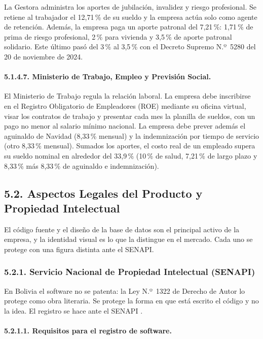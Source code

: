 La Gestora administra los aportes de jubilación, invalidez y riesgo profesional. Se retiene al trabajador el 12,71\,\% de su sueldo y la empresa actúa solo como agente de retención. Además, la empresa paga un aporte patronal del 7,21\,\%: 1,71\,\% de prima de riesgo profesional, 2\,\% para vivienda y 3,5\,\% de aporte patronal solidario. Este último pasó del 3\,\% al 3,5\,\% con el Decreto Supremo N.º~5280 del 20 de noviembre de 2024.

\paragraph{5.1.4.7. Ministerio de Trabajo, Empleo y Previsión Social.}

El Ministerio de Trabajo \parencite{mintrabajo2026} regula la relación laboral. La empresa debe inscribirse en el Registro Obligatorio de Empleadores (ROE) mediante su oficina virtual, visar los contratos de trabajo y presentar cada mes la planilla de sueldos, con un pago no menor al salario mínimo nacional. La empresa debe prever además el aguinaldo de Navidad (8,33\,\% mensual) y la indemnización por tiempo de servicio (otro 8,33\,\% mensual). Sumados los aportes, el costo real de un empleado supera su sueldo nominal en alrededor del 33,9\,\% (10\,\% de salud, 7,21\,\% de largo plazo y 8,33\,\% más 8,33\,\% de aguinaldo e indemnización).

\subsection{5.2. Aspectos Legales del Producto y Propiedad Intelectual}

El código fuente y el diseño de la base de datos son el principal activo de la empresa, y la identidad visual es lo que la distingue en el mercado. Cada uno se protege con una figura distinta ante el SENAPI.

\subsubsection{5.2.1. Servicio Nacional de Propiedad Intelectual (SENAPI)}

En Bolivia el software no se patenta: la Ley N.º~1322 de Derecho de Autor \parencite{ley1322} lo protege como obra literaria. Se protege la forma en que está escrito el código y no la idea. El registro se hace ante el SENAPI \parencite{senapi2026}.

\paragraph{5.2.1.1. Requisitos para el registro de software.}

